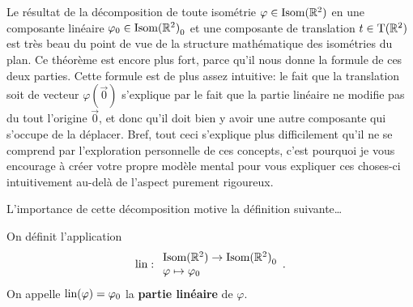 \documentclass{book}
\numberwithin{equation}{section}
\renewcommand{\phi}{\varphi}
\providecommand{\plan}{{\mathbb R^2}}
\providecommand{\origin}{{\vec 0}}
\providecommand{\transR}{{\textnormal{T}(\plan)}}
\providecommand{\isom}{{\textnormal{Isom}(\plan)}}
\providecommand{\isomo}{{\isom_0}}
\providecommand{\lin}{{\textnormal{lin}}}
\begin{document}
Le résultat de la décomposition de toute isométrie $\phi \in \isom$ en une composante linéaire $\phi_0 \in \isomo$ et une composante de translation $t \in \transR$ est très beau du point de vue de la structure mathématique des isométries du plan. Ce théorème est encore plus fort, parce qu'il nous donne la formule de ces deux parties. Cette formule est de plus assez intuitive: le fait que la translation soit de vecteur $\phi(\origin)$ s'explique par le fait que la partie linéaire ne modifie pas du tout l'origine $\origin$, et donc qu'il doit bien y avoir une autre composante qui s'occupe de la déplacer. Bref, tout ceci s'explique plus difficilement qu'il ne se comprend par l'exploration personnelle de ces concepts, c'est pourquoi je vous encourage à créer votre propre modèle mental pour vous expliquer ces choses-ci intuitivement au-delà de l'aspect purement rigoureux.\par
L'importance de cette décomposition motive la définition suivante\dots

\begin{defn}
	On définit l'application
	\begin{equation*}
		\lin: \begin{array}{l}
			\isom \to \isomo\\
			\phi \mapsto \phi_0
		\end{array}.
	\end{equation*}
	On appelle $\lin(\phi) = \phi_0$ la \textbf{partie linéaire} de $\phi$.
\end{defn}
\end{document}
